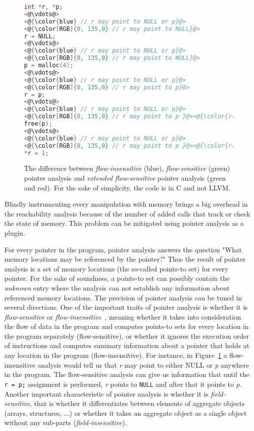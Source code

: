 \begin{figure}[t]
\begin{lstlisting}[language=C]
int *r, *p;
<@\vdots@>
<@{\color{blue} // r may point to NULL or p}@>
<@{\color[RGB]{0, 135,0} // r may point to NULL}@>
r = NULL;
<@\vdots@>
<@{\color{blue} // r may point to NULL or p}@>
<@{\color[RGB]{0, 135,0} // r may point to NULL}@>
p = malloc(4);
<@\vdots@>
<@{\color{blue} // r may point to NULL or p}@>
<@{\color[RGB]{0, 135,0} // r may point to p}@>
r = p;
<@\vdots@>
<@{\color{blue} // r may point to NULL or p}@>
<@{\color[RGB]{0, 135,0} // r may point to p }@><@{\color{red} or is invalidated}@>
free(p);
<@\vdots@>
<@{\color{blue} // r may point to NULL or p}@>
<@{\color[RGB]{0, 135,0} // r may point to p }@><@{\color{red} or is invalidated}@>
*r = 1;
\end{lstlisting}
\caption{The difference between \emph{flow-insensitive} (blue), \emph{flow-sensitive} (green) pointer analysis and \emph{extended flow-sensitive} pointer analysis (green and red). For the sake of simplicity, the code is in C and not LLVM.}
\label{fig:example2}
\end{figure}


Blindly instrumenting every manipulation with memory brings a big
overhead in the reachability analysis because of the number of added
calls that track or check the state of memory. This problem can be
mitigated using pointer analysis as a plugin.

For every pointer in the program, pointer analysis answers the
question "What memory locations may be referenced by the pointer?"
Thus the result of pointer analysis is a set of memory locations (the
so-called points-to set) for every pointer. For the sake of
soundness, a points-to set can possibly contain the \emph{unknown}
entry where the analysis can not establish any information about
referenced memory locations. The precision of pointer analysis can be
tuned in several directions. One of the important traits of pointer
analysis is whether it is \emph{flow-sensitive} or
\emph{flow-insensitive}~\cite{Hind01}, meaning whether it takes into
consideration the flow of data in the program and computes points-to
sets for every location in the program separately (flow-sensitive), or
whether it ignores the execution order of instructions and computes
summary information about a pointer that holds at any location in the
program (flow-insensitive). For instance, in
Figure~\ref{fig:example2} a flow-insensitive analysis would tell us
that \emph{r} may point to either NULL or \emph{p} anywhere in the
program. The flow-sensitive analysis can give us information that
until the \texttt{r = p;} assignment is performed, \emph{r} points to
\texttt{NULL} and after that it points to \emph{p}. Another important
characteristic of pointer analysis is whether it is
\emph{field-sensitive}, that is whether it differentiates between
elements of aggregate objects (arrays, structures, ...) or whether it
takes an aggregate object as a single object without any sub-parts
(\emph{field-insensitive}).

